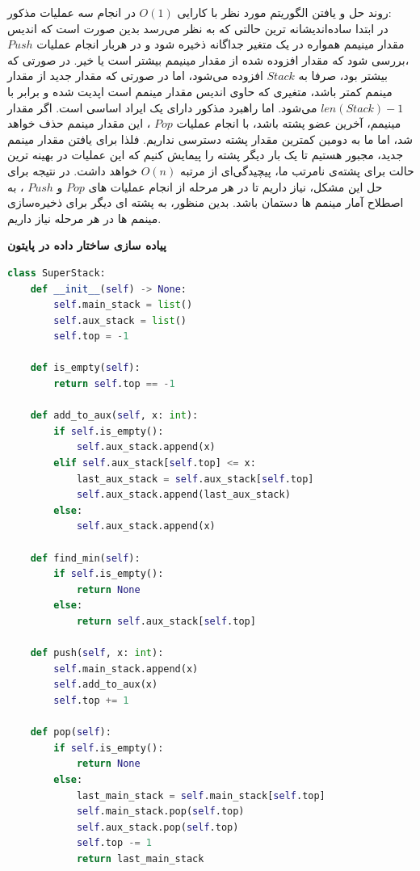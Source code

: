 \documentclass[]{article}
\begin{document}
روند حل و یافتن الگوریتم مورد نظر با کارایی
$O(1)$
در انجام سه عملیات مذکور:\\
در ابتدا ساده‌اندیشانه ترین حالتی که به نظر می‌رسد بدین صورت است که اندیس مقدار مینیمم همواره در یک متغیر جداگانه ذخیره شود و در هربار انجام عملیات $Push$
،بررسی شود که مقدار افزوده شده از مقدار مینیمم بیشتر است یا خیر. در صورتی که بیشتر بود، صرفا به 
$Stack$ 
افزوده می‌شود، اما در صورتی که مقدار جدید از مقدار مینمم کمتر باشد،
متغیری که حاوی اندیس مقدار مینمم است اپدیت شده و برابر با 
$len(Stack) - 1$ 
می‌شود. 
اما راهبرد مذکور دارای یک ایراد اساسی است. اگر مقدار مینیمم، آخرین عضو پشته باشد، با انجام عملیات 
$Pop$
، این مقدار مینمم حذف خواهد شد، اما ما به دومین کمترین مقدار پشته دسترسی نداریم. فلذا برای یافتن مقدار مینمم جدید، مجبور هستیم تا یک بار دیگر پشته را پیمایش کنیم که این عملیات در بهینه ترین حالت برای پشته‌ی نامرتب ما، پیچیدگی‌ای از مرتبه 
$O(n)$
خواهد داشت. 
در نتیجه برای حل این مشکل، نیاز داریم تا در هر مرحله از انجام عملیات های 
$Pop$ 
و 
$Push$
، به اصطلاح آمار مینمم ها دستمان باشد. بدین منظور، به پشته ای دیگر برای ذخیره‌سازی مینمم ها در هر مرحله نیاز داریم. 

\pagebreak
\begin{center}
    \textbf{پیاده سازی ساختار داده در پایتون}
\end{center}
\begin{latin}
    \begin{lstlisting}[language=Python, caption=Python Implementation of SuperStack]
class SuperStack:
    def __init__(self) -> None:
        self.main_stack = list()
        self.aux_stack = list()
        self.top = -1

    def is_empty(self):
        return self.top == -1

    def add_to_aux(self, x: int):
        if self.is_empty():
            self.aux_stack.append(x)
        elif self.aux_stack[self.top] <= x:
            last_aux_stack = self.aux_stack[self.top]
            self.aux_stack.append(last_aux_stack)
        else:
            self.aux_stack.append(x)

    def find_min(self):
        if self.is_empty():
            return None
        else:
            return self.aux_stack[self.top]

    def push(self, x: int):
        self.main_stack.append(x)
        self.add_to_aux(x)
        self.top += 1

    def pop(self):
        if self.is_empty():
            return None
        else:
            last_main_stack = self.main_stack[self.top]
            self.main_stack.pop(self.top)
            self.aux_stack.pop(self.top)
            self.top -= 1
            return last_main_stack
    
\end{lstlisting}
\end{latin}
\end{document}
